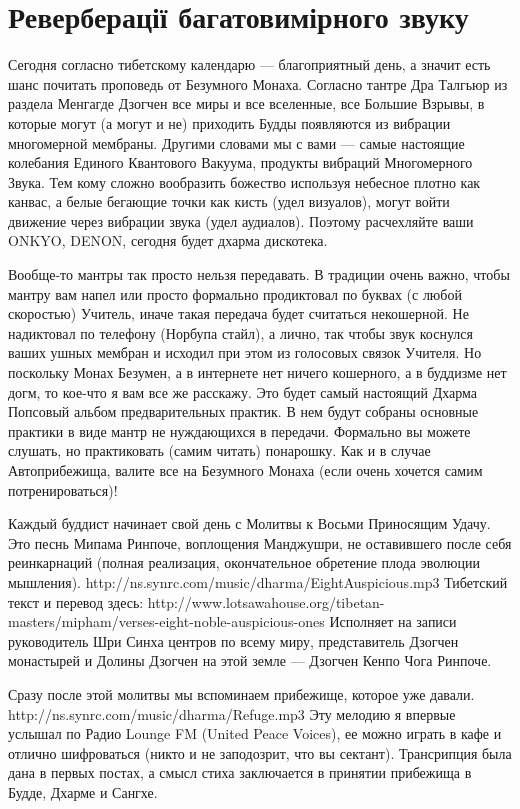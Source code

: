 \section{Реверберації багатовимірного звуку}

Сегодня согласно тибетскому календарю — благоприятный день,
а значит есть шанс почитать проповедь от Безумного Монаха.
Согласно тантре Дра Талгьюр из раздела Менгагде Дзогчен все
миры и все вселенные, все Большие Взрывы, в которые могут
(а могут и не) приходить Будды появляются из вибрации
многомерной мембраны. Другими словами мы с вами — самые
настоящие колебания Единого Квантового Вакуума, продукты
вибраций Многомерного Звука. Тем кому сложно вообразить
божество используя небесное плотно как канвас, а белые
бегающие точки как кисть (удел визуалов), могут войти
движение через вибрации звука (удел аудиалов). Поэтому
расчехляйте ваши ONKYO, DENON, сегодня будет дхарма дискотека.

Вообще-то мантры так просто нельзя передавать. В традиции
очень важно, чтобы мантру вам напел или просто формально
продиктовал по буквах (с любой скоростью) Учитель, иначе
такая передача будет считаться некошерной. Не надиктовал
по телефону (Норбупа стайл), а лично, так чтобы звук
коснулся ваших ушных мембран и исходил при этом из голосовых
связок Учителя. Но поскольку Монах Безумен, а в интернете
нет ничего кошерного, а в буддизме нет догм, то кое-что я
вам все же расскажу. Это будет самый настоящий Дхарма Попсовый
альбом предварительных практик. В нем будут собраны основные
практики в виде мантр не нуждающихся в передачи. Формально
вы можете слушать, но практиковать (самим читать) понарошку.
Как и в случае Автоприбежища, валите все на Безумного Монаха (если очень хочется самим потренироваться)!

Каждый буддист начинает свой день с Молитвы к Восьми Приносящим Удачу.
Это песнь Мипама Ринпоче, воплощения Манджушри, не оставившего после
себя реинкарнаций (полная реализация, окончательное обретение плода
эволюции мышления). http://ns.synrc.com/music/dharma/EightAuspicious.mp3
Тибетский текст и перевод здесь:
http://www.lotsawahouse.org/tibetan-masters/mipham/verses-eight-noble-auspicious-ones
Исполняет на записи руководитель Шри Синха центров по всему миру, представитель
Дзогчен монастырей и Долины Дзогчен на этой земле — Дзогчен Кенпо Чога Ринпоче. 

Сразу после этой молитвы мы вспоминаем прибежище, которое уже давали.
http://ns.synrc.com/music/dharma/Refuge.mp3 Эту мелодию я впервые
услышал по Радио Lounge FM (United Peace Voices), ее можно играть
в кафе и отлично шифроваться (никто и не заподозрит, что вы сектант).
Трансрипция была дана в первых постах, а смысл стиха заключается в
принятии прибежища в Будде, Дхарме и Сангхе.

